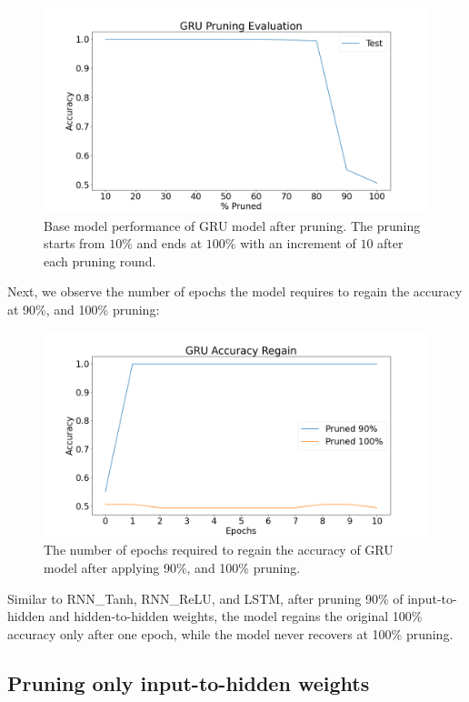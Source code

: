 \begin{figure}[h]
	\centering
	\includegraphics[width=0.8\linewidth]{images/results/pruning/gru_pruning_evaluation.png}
	\caption[GRU base model performance after pruning]%
	{Base model performance of GRU model after pruning. The pruning starts from $10\%$ and ends at $100\%$ with an increment of $10$ after each pruning round.}
	\label{fig:gru_prune}
\end{figure}

Next, we observe the number of epochs the model requires to regain the accuracy at 90\%, and 100\% pruning:

\begin{figure}[h]
	\centering
	\includegraphics[width=0.8\linewidth]{images/results/pruning/gru_accuracy_regain.png}
	\caption[GRU base model performance regain after pruning]%
	{The number of epochs required to regain the accuracy of GRU model after applying 90\%, and 100\% pruning.}
	\label{fig:gru_prune_regain}
\end{figure}

Similar to RNN\_Tanh, RNN\_ReLU, and LSTM, after pruning 90\% of input-to-hidden and hidden-to-hidden weights, the model regains the original 100\% accuracy only after one epoch, while the model never recovers at 100\% pruning.

\subsection{Pruning only input-to-hidden weights}

